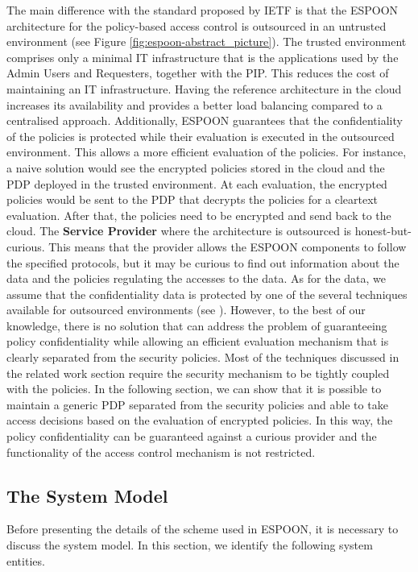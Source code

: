 \documentclass[epsfig,a4paper,11pt,titlepage]{book}
\numberwithin{algorithm}{chapter}
\begin{document}
The main difference with the standard proposed by \gls{IETF} is that the \gls{ESPOON} architecture for the policy-based access control is outsourced in an untrusted environment (see Figure \ref{fig:espoon-abstract_picture}). The trusted environment comprises only a minimal \gls{IT} infrastructure that is the applications used by the Admin Users and Requesters, together with the \gls{PIP}. This reduces the cost of maintaining an \gls{IT} infrastructure. Having the reference architecture in the cloud increases its availability and provides a better load balancing compared to a centralised approach. Additionally, \gls{ESPOON} guarantees that the confidentiality of the policies is protected while their evaluation is executed in the outsourced environment. This allows a more efficient evaluation of the policies. For instance, a naive solution would see the encrypted policies stored in the cloud and the \gls{PDP} deployed in the trusted environment. At each evaluation, the encrypted policies would be sent to the \gls{PDP} that decrypts the policies for a cleartext evaluation. After that, the policies need to be encrypted and send back to the cloud. The \textbf{Service Provider} where the architecture is outsourced is honest-but-curious. This means that the provider allows the \gls{ESPOON} components to follow the specified protocols, but it may be curious to find out information about the data and the policies regulating the accesses to the data. As for the data, we assume that the confidentiality data is protected by one of the several techniques available for outsourced environments (see \cite{Dong:2008, Rhee:2010, Shao:2010, Dong:2011}). However, to the best of our knowledge, there is no solution that can address the problem of guaranteeing policy confidentiality while allowing an efficient evaluation mechanism that is clearly separated from the security policies. Most of the techniques discussed in the related work section require the security mechanism to be tightly coupled with the policies. In the following section, we can show that it is possible to maintain a generic \gls{PDP} separated from the security policies and able to take access decisions based on the evaluation of encrypted policies. In this way, the policy confidentiality can be guaranteed against a curious provider and the functionality of the access control mechanism is not restricted.

\subsection{The System Model}
\label{sec:esooon-system-model}
Before presenting the details of the scheme used in \gls{ESPOON}, it is necessary to discuss the system model. In this section, we identify the following system entities.
\end{document}
